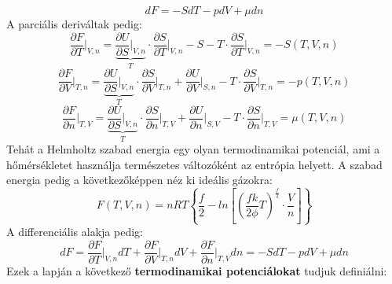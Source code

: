 \documentclass[../main.tex]{subfiles}
\begin{document}
\begin{equation}
    dF = - S dT - p dV + \mu dn
\end{equation}
A parciális deriváltak pedig:
\begin{equation}
    \frac{\partial F}{\partial T}\bigg|_{V,n} = \underbrace{\frac{\partial U}{\partial S}\bigg|_{V,n}}_{T} \cdot \frac{\partial S}{\partial T}\bigg|_{V,n} - S - T \cdot \frac{\partial S}{\partial T}\bigg|_{V,n} = - S(T, V, n)
\end{equation}
\begin{equation}
    \frac{\partial F}{\partial V}\bigg|_{T,n} = \underbrace{\frac{\partial U}{\partial S}\bigg|_{V,n}}_{T} \cdot \frac{\partial S}{\partial V}\bigg|_{T,n} + \frac{\partial U}{\partial V}\bigg|_{S,n} - T \cdot \frac{\partial S}{\partial V}\bigg|_{T,n} = - p(T, V, n)
\end{equation}
\begin{equation}
    \frac{\partial F}{\partial n}\bigg|_{T,V} = \underbrace{\frac{\partial U}{\partial S}\bigg|_{V,n}}_{T} \cdot \frac{\partial S}{\partial n}\bigg|_{T,V} + \frac{\partial U}{\partial n}\bigg|_{S,V} - T \cdot \frac{\partial S}{\partial n}\bigg|_{T,V} = \mu(T, V, n)
\end{equation}
Tehát a Helmholtz szabad energia egy olyan termodinamikai potenciál, ami a hőmérsékletet használja természetes változóként az entrópia helyett. 
A szabad energia pedig a következőképpen néz ki ideális gázokra:
\begin{equation}
    F(T, V, n) = n R T \left\{\frac{f}{2} - ln \left[\left(\frac{fk}{2\phi}T\right)^{\frac{f}{2}}\cdot \frac{V}{n} \right]\right\}
\end{equation}
A differenciális alakja pedig:
\begin{equation}
    dF = \frac{\partial F}{\partial T}\bigg|_{V,n} dT + \frac{\partial F}{\partial V}\bigg|_{T,n} dV + \frac{\partial F}{\partial n}\bigg|_{T,V} dn = - S dT - p dV + \mu dn
\end{equation}
\newline
\newline
Ezek a lapján a következő \textbf{termodinamikai potenciálokat} tudjuk definiálni:
\end{document}
